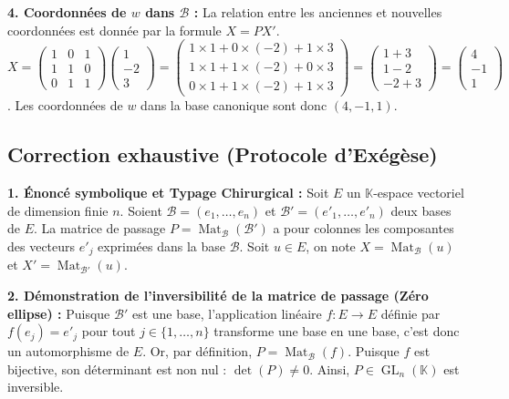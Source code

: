\documentclass{report}
\begin{document}
\textbf{4. Coordonnées de $w$ dans $\mathcal{B}$ :}
La relation entre les anciennes et nouvelles coordonnées est donnée par la formule $X = P X'$.
$X = \begin{pmatrix} 1 & 0 & 1 \\ 1 & 1 & 0 \\ 0 & 1 & 1 \end{pmatrix} \begin{pmatrix} 1 \\ -2 \\ 3 \end{pmatrix} = \begin{pmatrix} 1 \times 1 + 0 \times (-2) + 1 \times 3 \\ 1 \times 1 + 1 \times (-2) + 0 \times 3 \\ 0 \times 1 + 1 \times (-2) + 1 \times 3 \end{pmatrix} = \begin{pmatrix} 1 + 3 \\ 1 - 2 \\ -2 + 3 \end{pmatrix} = \begin{pmatrix} 4 \\ -1 \\ 1 \end{pmatrix}$.
Les coordonnées de $w$ dans la base canonique sont donc $(4, -1, 1)$.







\subsection*{Correction exhaustive (Protocole d'Exégèse)}

\textbf{1. Énoncé symbolique et Typage Chirurgical :}
Soit $E$ un $\mathbb{K}$-espace vectoriel de dimension finie $n$. Soient $\mathcal{B} = (e_1, \dots, e_n)$ et $\mathcal{B}' = (e'_1, \dots, e'_n)$ deux bases de $E$.
La matrice de passage $P = \operatorname{Mat}_{\mathcal{B}}(\mathcal{B}')$ a pour colonnes les composantes des vecteurs $e'_j$ exprimées dans la base $\mathcal{B}$.
Soit $u \in E$, on note $X = \operatorname{Mat}_{\mathcal{B}}(u)$ et $X' = \operatorname{Mat}_{\mathcal{B}'}(u)$.

\textbf{2. Démonstration de l'inversibilité de la matrice de passage (Zéro ellipse) :}
Puisque $\mathcal{B}'$ est une base, l'application linéaire $f : E \to E$ définie par $f(e_j) = e'_j$ pour tout $j \in \{1, \dots, n\}$ transforme une base en une base, c'est donc un automorphisme de $E$.
Or, par définition, $P = \operatorname{Mat}_{\mathcal{B}}(f)$.
Puisque $f$ est bijective, son déterminant est non nul : $\det(P) \neq 0$.
Ainsi, $P \in \operatorname{GL}_n(\mathbb{K})$ est inversible.
\end{document}
